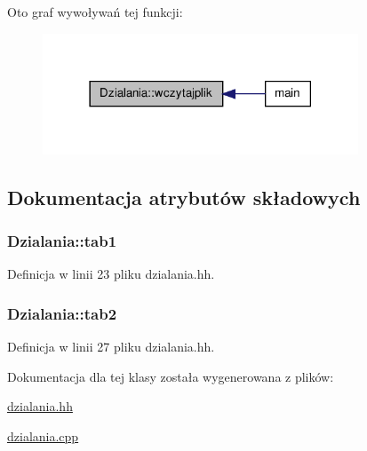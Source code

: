 Oto graf wywoływań tej funkcji\-:\nopagebreak
\begin{figure}[H]
\begin{center}
\leavevmode
\includegraphics[width=266pt]{class_dzialania_a4d1a1b41a0f2f76d4c16ad20f77b7cfa_icgraph}
\end{center}
\end{figure}




\subsection{Dokumentacja atrybutów składowych}
\hypertarget{class_dzialania_aa1cf12383b1e7fe159856ff7a29216fc}{
\subsubsection[{tab1}]{ Dzialania\-::tab1\hspace{0.3cm}{\ttfamily [private]}}}\label{class_dzialania_aa1cf12383b1e7fe159856ff7a29216fc}


Definicja w linii 23 pliku dzialania.\-hh.

\hypertarget{class_dzialania_a63fcc04c8e704850ceec908ed61b408a}{
\subsubsection[{tab2}]{ Dzialania\-::tab2\hspace{0.3cm}{\ttfamily [private]}}}\label{class_dzialania_a63fcc04c8e704850ceec908ed61b408a}


Definicja w linii 27 pliku dzialania.\-hh.



Dokumentacja dla tej klasy została wygenerowana z plików\-:\begin{DoxyCompactItemize}
\item 
\hyperlink{dzialania_8hh}{dzialania.\-hh}\item 
\hyperlink{dzialania_8cpp}{dzialania.\-cpp}\end{DoxyCompactItemize}
